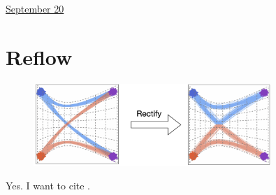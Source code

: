 \documentclass[11pt,letterpaper]{article}
\begin{document}
\href{run:2025-09-20.tex}{\Huge September 20} %

\section*{Reflow}

\begin{figure}[h]
\centering 
\includegraphics[width=0.8\textwidth]{assets/figures/2025/curved_reflow.png}
\end{figure} 


Yes. I want to cite \cite{li2022diffusion}. 


 
\end{document}
